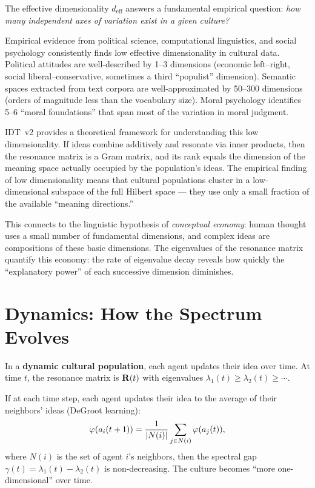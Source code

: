 \begin{interpretation}
\label{interp:dimensionality}
The effective dimensionality $d_{\text{eff}}$ answers a fundamental empirical
question: \emph{how many independent axes of variation exist in a given
culture?}

Empirical evidence from political science, computational linguistics, and
social psychology consistently finds low effective dimensionality in cultural
data. Political attitudes are well-described by 1--3 dimensions (economic
left--right, social liberal--conservative, sometimes a third ``populist''
dimension). Semantic spaces extracted from text corpora are well-approximated
by 50--300 dimensions (orders of magnitude less than the vocabulary size).
Moral psychology identifies 5--6 ``moral foundations'' that span most of the
variation in moral judgment.

IDT~v2 provides a theoretical framework for understanding this low
dimensionality. If ideas combine additively and resonate via inner products,
then the resonance matrix is a Gram matrix, and its rank equals the dimension
of the meaning space actually occupied by the population's ideas. The
empirical finding of low dimensionality means that cultural populations
cluster in a low-dimensional subspace of the full Hilbert space ---
they use only a small fraction of the available ``meaning directions.''

This connects to the linguistic hypothesis of \emph{conceptual economy}: human
thought uses a small number of fundamental dimensions, and complex ideas are
compositions of these basic dimensions. The eigenvalues of the resonance matrix
quantify this economy: the rate of eigenvalue decay reveals how quickly
the ``explanatory power'' of each successive dimension diminishes.
\end{interpretation}


\section{Dynamics: How the Spectrum Evolves}

\begin{definition}
\label{def:spectral-evolution}
In a \textbf{dynamic cultural population}, each agent updates their idea over
time. At time $t$, the resonance matrix is $\mathbf{R}(t)$ with eigenvalues
$\lambda_1(t) \geq \lambda_2(t) \geq \cdots$.
\end{definition}

\begin{proposition}
\label{prop:averaging}
If at each time step, each agent updates their idea to the average of their
neighbors' ideas (DeGroot learning):
\[
  \varphi(a_i(t+1)) = \frac{1}{|N(i)|} \sum_{j \in N(i)} \varphi(a_j(t)),
\]
where $N(i)$ is the set of agent $i$'s neighbors, then the spectral gap
$\gamma(t) = \lambda_1(t) - \lambda_2(t)$ is non-decreasing. The culture
becomes ``more one-dimensional'' over time.
\end{proposition}

